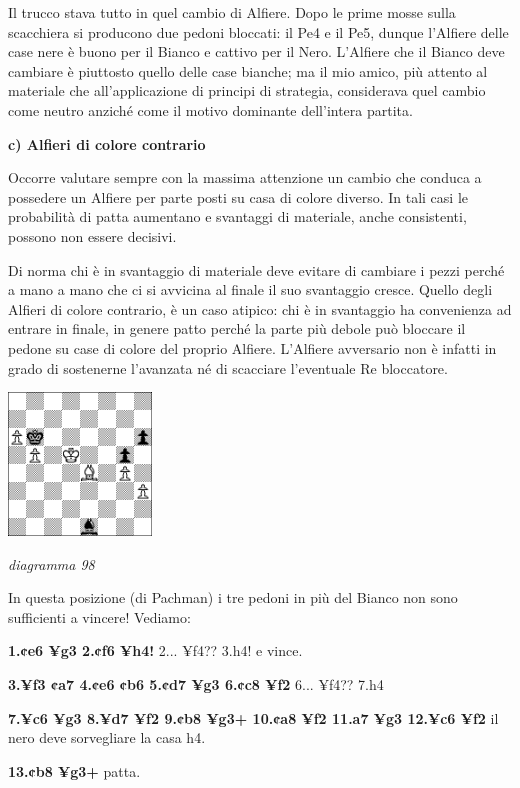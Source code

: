 \documentclass[
]{article}
\begin{document}
Il trucco stava tutto in quel cambio di Alfiere. Dopo le prime mosse
sulla scacchiera si producono due pedoni bloccati: il Pe4 e il Pe5,
dunque l'Alfiere delle case nere è buono per il Bianco e cattivo per il
Nero. L'Alfiere che il Bianco deve cambiare è piuttosto quello delle
case bianche; ma il mio amico, più attento al materiale che
all'applicazione di principi di strategia, considerava quel cambio come
neutro anziché come il motivo dominante dell'intera partita.

\textbf{c) Alfieri di colore contrario}

Occorre valutare sempre con la massima attenzione un cambio che conduca
a possedere un Alfiere per parte posti su casa di colore diverso. In
tali casi le probabilità di patta aumentano e svantaggi di materiale,
anche consistenti, possono non essere decisivi.

Di norma chi è in svantaggio di materiale deve evitare di cambiare i
pezzi perché a mano a mano che ci si avvicina al finale il suo
svantaggio cresce. Quello degli Alfieri di colore contrario, è un caso
atipico: chi è in svantaggio ha convenienza ad entrare in finale, in
genere patto perché la parte più debole può bloccare il pedone su case
di colore del proprio Alfiere. L'Alfiere avversario non è infatti in
grado di sostenerne l'avanzata né di scacciare l'eventuale Re
bloccatore.

\includegraphics[width=1.5in,height=1.5in]{vertopal_109f12be458a423d8f3cc838880eaea2/media/image98.png}

\emph{diagramma 98}

In questa posizione (di Pachman) i tre pedoni in più del Bianco non sono
sufficienti a vincere! Vediamo:

\textbf{1.¢e6 ¥g3 2.¢f6 ¥h4!} 2... ¥f4?? 3.h4! e vince.

\textbf{3.¥f3 ¢a7 4.¢e6 ¢b6 5.¢d7 ¥g3 6.¢c8 ¥f2} 6... ¥f4?? 7.h4

\textbf{7.¥c6 ¥g3 8.¥d7 ¥f2 9.¢b8 ¥g3+ 10.¢a8 ¥f2 11.a7 ¥g3 12.¥c6 ¥f2}
il nero deve sorvegliare la casa h4.

\textbf{13.¢b8 ¥g3+} patta.
\end{document}
